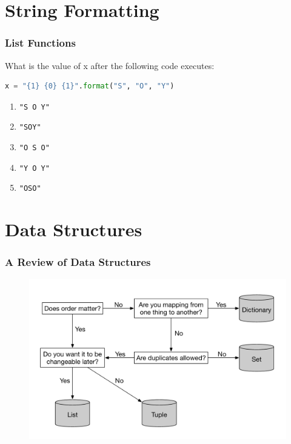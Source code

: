 \documentclass{beamer}
\begin{document}
\section{String Formatting}

\begin{frame}[fragile]
  \frametitle{List Functions}
  What is the value of x after the following code executes:
  \begin{lstlisting}[language=Python, autogobble] 
  x = "{1} {0} {1}".format("S", "O", "Y")
  \end{lstlisting}
  \vfill
  \begin{enumerate}[A] 
    \item \lstinline|"S O Y"|
    \item \lstinline|"SOY"|
    \item \lstinline|"O S O"| %
    \item \lstinline|"Y O Y"|
    \item \lstinline|"OSO"|
  \end{enumerate}
\end{frame}

\section{Data Structures}

%
%
\begin{frame}
    \frametitle{A Review of Data Structures}
    \begin{figure}
        \centering
        \includegraphics[width=.75\textwidth]{./imgs/datastructs.png}
    \end{figure}
\end{frame}
\end{document}
